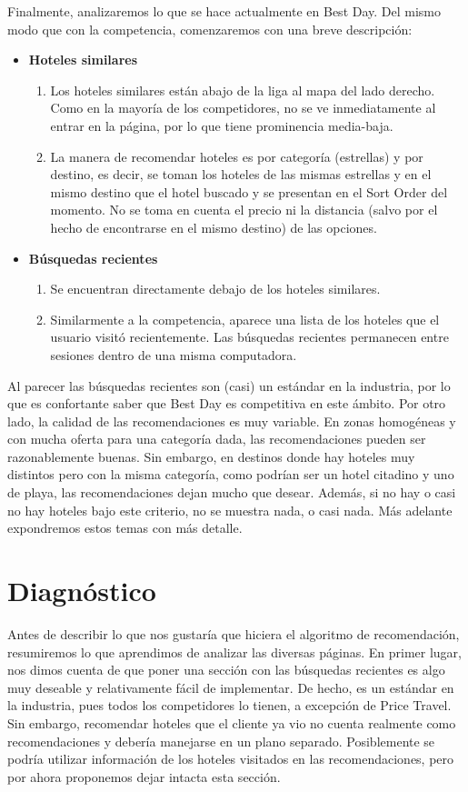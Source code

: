 \documentclass[12pt]{report}
\begin{document}
Finalmente, analizaremos lo que se hace actualmente en Best Day. Del mismo modo que con la competencia, comenzaremos con una breve descripción:
\begin{itemize}
	\item \textbf{Hoteles similares}
	\begin{enumerate}
		\item Los hoteles similares están abajo de la liga al mapa del lado derecho. Como en la mayoría de los competidores, no se ve inmediatamente al entrar en la página, por lo que tiene prominencia media-baja.
		\item La manera de recomendar hoteles es por categoría (estrellas) y por destino, es decir, se toman los hoteles de las mismas estrellas y en el mismo destino que el hotel buscado y se presentan en el Sort Order del momento. No se toma en cuenta el precio ni la distancia (salvo por el hecho de encontrarse en el mismo destino) de las opciones.
	\end{enumerate}
	\item \textbf{Búsquedas recientes}
	\begin{enumerate}
		\item Se encuentran directamente debajo de los hoteles similares.
		\item Similarmente a la competencia, aparece una lista de los hoteles que el usuario visitó recientemente. Las búsquedas recientes permanecen entre sesiones dentro de una misma computadora.
	\end{enumerate}
\end{itemize}
Al parecer las búsquedas recientes son (casi) un estándar en la industria, por lo que es confortante saber que Best Day es competitiva en este ámbito. Por otro lado, la calidad de las recomendaciones es muy variable. En zonas homogéneas y con mucha oferta para una categoría dada, las recomendaciones pueden ser razonablemente buenas. Sin embargo, en destinos donde hay hoteles muy distintos pero con la misma categoría, como podrían ser un hotel citadino y uno de playa, las recomendaciones dejan mucho que desear. Además, si no hay o casi no hay hoteles bajo este criterio, no se muestra nada, o casi nada. Más adelante expondremos estos temas con más detalle.

\section{Diagnóstico}

Antes de describir lo que nos gustaría que hiciera el algoritmo de recomendación, resumiremos lo que aprendimos de analizar las diversas páginas. En primer lugar, nos dimos cuenta de que poner una sección con las búsquedas recientes es algo muy deseable y relativamente fácil de implementar. De hecho, es un estándar en la industria, pues todos los competidores lo tienen, a excepción de Price Travel. Sin embargo, recomendar hoteles que el cliente ya vio no cuenta realmente como recomendaciones y debería manejarse en un plano separado. Posiblemente se podría utilizar información de los hoteles visitados en las recomendaciones, pero por ahora proponemos dejar intacta esta sección.
\end{document}
